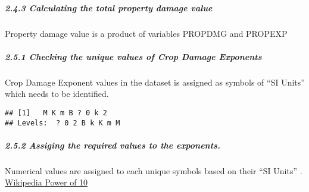 \documentclass[]{article}
\newenvironment{Shaded}{\begin{snugshade}}{\end{snugshade}}
\newcommand{\CommentTok}[1]{\textcolor[rgb]{0.56,0.35,0.01}{\textit{#1}}}
\newcommand{\DecValTok}[1]{\textcolor[rgb]{0.00,0.00,0.81}{#1}}
\newcommand{\KeywordTok}[1]{\textcolor[rgb]{0.13,0.29,0.53}{\textbf{#1}}}
\newcommand{\NormalTok}[1]{#1}
\newcommand{\OperatorTok}[1]{\textcolor[rgb]{0.81,0.36,0.00}{\textbf{#1}}}
\newcommand{\StringTok}[1]{\textcolor[rgb]{0.31,0.60,0.02}{#1}}
\let\oldsubparagraph\subparagraph
\renewcommand{\subparagraph}[1]{\oldsubparagraph{#1}\mbox{}}
\begin{document}
\begin{Shaded}
\end{Shaded}

\hypertarget{calculating-the-total-property-damage-value}{%
\subparagraph{2.4.3 Calculating the total property damage
value}\label{calculating-the-total-property-damage-value}}

Property damage value is a product of variables PROPDMG and PROPEXP

\begin{Shaded}
\end{Shaded}

\hypertarget{checking-the-unique-values-of-crop-damage-exponents}{%
\subparagraph{2.5.1 Checking the unique values of Crop Damage
Exponents}\label{checking-the-unique-values-of-crop-damage-exponents}}

Crop Damage Exponent values in the dataset is assigned as symbols of
``SI Units'' which needs to be identified.

\begin{Shaded}
\end{Shaded}

\begin{verbatim}
## [1]   M K m B ? 0 k 2
## Levels:  ? 0 2 B k K m M
\end{verbatim}

\hypertarget{assiging-the-required-values-to-the-exponents.-1}{%
\subparagraph{2.5.2 Assiging the required values to the
exponents.}\label{assiging-the-required-values-to-the-exponents.-1}}

Numerical values are assigned to each unique symbols based on their ``SI
Units'' . \href{https://en.wikipedia.org/wiki/Power_of_10}{Wikipedia
Power of 10}
\end{document}
